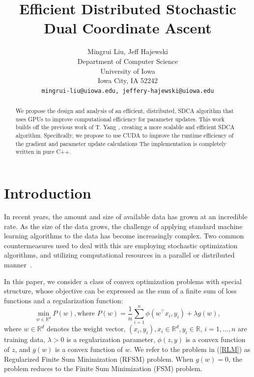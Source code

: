 \documentclass{article}
\title{Efficient Distributed Stochastic Dual Coordinate Ascent}
\author{
  Mingrui Liu, Jeff Hajewski \\
  Department of Computer Science\\
  University of Iowa\\
  Iowa City, IA  52242 \\
  \texttt{mingrui-liu@uiowa.edu, jeffery-hajewski@uiowa.edu} \\
}
\def \R {\mathbb{R}}
\def \R {\mathbb{R}}
\begin{document}

\maketitle

\begin{abstract}
We propose the design and analysis of an efficient, distributed, 
SDCA algorithm that uses GPUs to improve computational efficiency for parameter updates. This work builds off the previous work of T.
Yang \cite{yang2013trading}, 
 creating a more scalable and efficient SDCA
algorithm. Specifically, we propose to use CUDA to improve the runtime
efficiency of the gradient and parameter update calculations %
The implementation is completely written in pure C++.
\end{abstract}

\section{Introduction}
In recent years, the amount and size of available data has grown at an
incredible rate. As the size of the data grows, the challenge of applying
standard machine learning algorithms to the data has become increasingly
complex. Two common countermeasures used to deal with this are employing
stochastic optimization algorithms, and utilizing computational resources in a
parallel or distributed manner~\cite{boyd2011distributed}. 

In this paper, we consider a class of convex optimization problems with special
structure, whose objective can be expressed as the sum of a finite sum of loss
functions and a regularization function: \begin{equation}
\label{RLM}
	\min_{w\in\R^d}P(w), \text{where }P(w)=\frac{1}{n}\sum_{i=1}^{n}\phi(w^\top x_i,y_i)+\lambda g(w),
\end{equation}
where $w\in\R^d$ denotes the weight vector, $(x_i,y_i),x_i\in\R^d,y_i\in\R$,
$i=1,\ldots,n$ are training data, $\lambda>0$ is a regularization parameter,
$\phi(z,y)$ is a convex function of $z$, and $g(w)$ is a convex function of $w$.
We refer to the problem in (\ref{RLM}) as Regularized Finite Sum Minimization
(RFSM) problem. When $g(w)=0$, the problem reduces to the Finite Sum
Minimization (FSM) problem.
\end{document}
